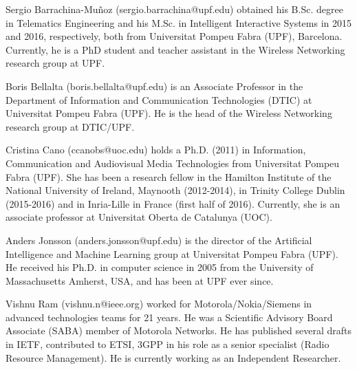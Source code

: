 \documentclass[journal]{IEEEtran}
\begin{document}

\begin{IEEEbiographynophoto}{Sergio Barrachina-Mu\~noz}
(sergio.barrachina@upf.edu) obtained his B.Sc. degree in Telematics Engineering and his M.Sc. in Intelligent Interactive Systems in 2015 and 2016, respectively, both from Universitat Pompeu Fabra (UPF), Barcelona. Currently, he is a PhD student and teacher assistant in the Wireless Networking research group at UPF.
\end{IEEEbiographynophoto}

\begin{IEEEbiographynophoto}{Boris Bellalta}
(boris.bellalta@upf.edu) is an Associate Professor in the Department of Information and Communication Technologies (DTIC) at Universitat Pompeu Fabra (UPF). He is the head of the Wireless Networking research group at DTIC/UPF.
\end{IEEEbiographynophoto}

\begin{IEEEbiographynophoto}{Cristina Cano}
	(ccanobs@uoc.edu) holds a Ph.D. (2011) in Information, Communication and Audiovisual Media Technologies from Universitat Pompeu Fabra (UPF). She has been a research fellow in the Hamilton Institute of the National University of Ireland, Maynooth (2012-2014), in Trinity College Dublin (2015-2016) and in Inria-Lille in France (first half of 2016). Currently, she is an associate professor at Universitat Oberta de Catalunya (UOC). 
\end{IEEEbiographynophoto}

\begin{IEEEbiographynophoto}{Anders Jonsson}
(anders.jonsson@upf.edu) is the director of the Artificial Intelligence and Machine Learning group at Universitat Pompeu Fabra (UPF). He received his Ph.D. in computer science in 2005 from the University of Massachusetts Amherst, USA, and has been at UPF ever since.
\end{IEEEbiographynophoto}

\begin{IEEEbiographynophoto}{Vishnu Ram}
(vishnu.n@ieee.org) worked for Motorola/Nokia/Siemens in advanced technologies teams for 21 years. He was a Scientific Advisory Board Associate (SABA) member of Motorola Networks. He has published several drafts in IETF, contributed to ETSI, 3GPP in his role as a senior specialist (Radio Resource Management). He is currently working as an Independent Researcher.	
\end{IEEEbiographynophoto}






\end{document}
